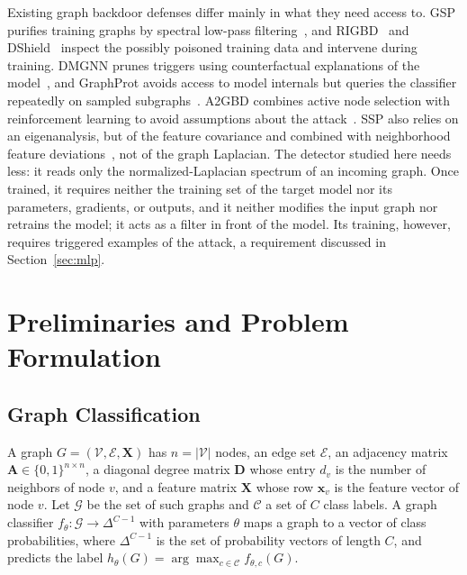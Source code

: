 \documentclass[journal]{IEEEtran}
\newcommand{\bA}{\mathbf{A}}            %
\newcommand{\bD}{\mathbf{D}}            %
\newcommand{\bX}{\mathbf{X}}            %
\newcommand{\calV}{\mathcal{V}}         %
\newcommand{\calE}{\mathcal{E}}         %
\newcommand{\calG}{\mathcal{G}}         %
\newcommand{\calC}{\mathcal{C}}         %
\begin{document}
Existing graph backdoor defenses differ mainly in what they need access to.
GSP purifies training graphs by spectral low-pass filtering~\cite{gsp2025},
and RIGBD~\cite{rigbd2025} and DShield~\cite{dshield2025} inspect the possibly
poisoned training data and intervene during training. DMGNN prunes triggers
using counterfactual explanations of the model~\cite{dmgnn2024}, and GraphProt
avoids access to model internals but queries the classifier repeatedly on
sampled subgraphs~\cite{graphprot2025}. A2GBD combines active node selection
with reinforcement learning to avoid assumptions about the
attack~\cite{a2gbd2026}. SSP also relies on an eigenanalysis, but of the
feature covariance and combined with neighborhood feature
deviations~\cite{ssp2026}, not of the graph Laplacian. The detector studied
here needs less: it reads only the normalized-Laplacian spectrum of an
incoming graph. Once trained, it requires neither the training set of the
target model nor its parameters, gradients, or outputs, and it neither
modifies the input graph nor retrains the model; it acts as a filter in front
of the model. Its training, however, requires triggered examples of the
attack, a requirement discussed in Section~\ref{sec:mlp}.

\section{Preliminaries and Problem Formulation}\label{sec:prelim}

\subsection{Graph Classification}
A graph $G=(\calV,\calE,\bX)$ has $n=|\calV|$ nodes, an edge set $\calE$, an
adjacency matrix $\bA\in\{0,1\}^{n\times n}$, a diagonal degree matrix $\bD$
whose entry $d_v$ is the number of neighbors of node $v$, and a feature matrix
$\bX$ whose row $\mathbf{x}_v$ is the feature vector of node $v$. Let $\calG$
be the set of such graphs and $\calC$ a set of $C$ class labels. A graph
classifier $f_\theta\colon\calG\to\Delta^{C-1}$ with parameters $\theta$ maps a
graph to a vector of class probabilities, where $\Delta^{C-1}$ is the set of
probability vectors of length $C$, and predicts the label
$h_\theta(G)=\arg\max_{c\in\calC} f_{\theta,c}(G)$.
\end{document}
